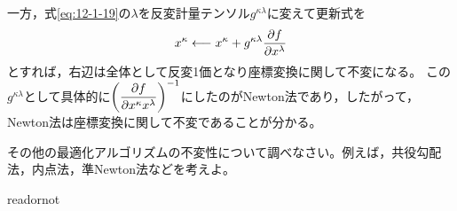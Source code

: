 \documentclass[uplatex]{jsarticle}
\begin{document}
一方，式\eqref{eq:12-1-19}の$\lambda$を反変計量テンソル$g^{\kappa\lambda}$に変えて更新式を
\begin{align}
  x^{\kappa} \longleftarrow x^{\kappa} + g^{\kappa\lambda} \dfrac{\partial f}{\partial x^{\lambda}} \label{eq:12-1-20}
\end{align}
とすれば，右辺は全体として反変1価となり座標変換に関して不変になる。
この$g^{\kappa\lambda}$として具体的に$\left( \dfrac{\partial f}{\partial x^{\kappa}x^{\lambda}}\right)^{-1}$にしたのがNewton法であり，したがって，Newton法は座標変換に関して不変であることが分かる。

\sukima{} その他の最適化アルゴリズムの不変性について調べなさい。例えば，共役勾配法，内点法，準Newton法などを考えよ。
  
\expandafter\ifx\csname readornot\endcsname\relax
  
\end{document}
